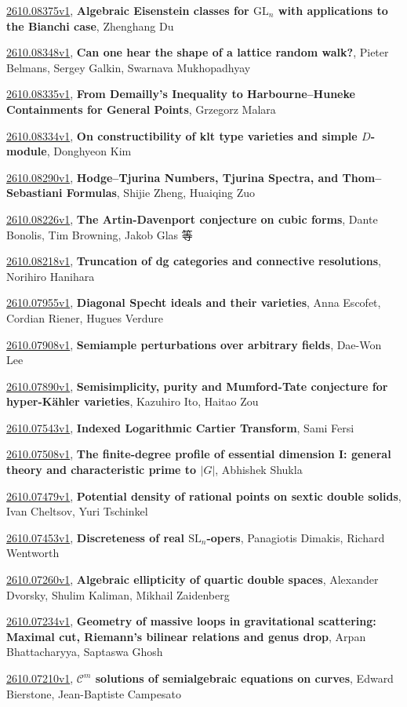 \documentclass[9pt, a4paper]{article}
\theoremstyle{plain}
\theoremstyle{definition}
\theoremstyle{remark}
\newcommand{\arxiv}[3]{\href{https://arxiv.org/abs/#1}{#1}, \textbf{\textcolor{arxivblue}{#2}}, #3}
\begin{document}
\arxiv{2610.08375v1}{Algebraic Eisenstein classes for $\mathrm{GL}_n$ with applications to the Bianchi case}{Zhenghang Du}

\arxiv{2610.08348v1}{Can one hear the shape of a lattice random walk?}{Pieter Belmans, Sergey Galkin, Swarnava Mukhopadhyay}

\arxiv{2610.08335v1}{From Demailly's Inequality to Harbourne--Huneke Containments for General Points}{Grzegorz Malara}

\arxiv{2610.08334v1}{On constructibility of klt type varieties and simple $D$-module}{Donghyeon Kim}

\arxiv{2610.08290v1}{Hodge--Tjurina Numbers, Tjurina Spectra, and Thom--Sebastiani Formulas}{Shijie Zheng, Huaiqing Zuo}

\arxiv{2610.08226v1}{The Artin-Davenport conjecture on cubic forms}{Dante Bonolis, Tim Browning, Jakob Glas 等}

\arxiv{2610.08218v1}{Truncation of dg categories and connective resolutions}{Norihiro Hanihara}

\arxiv{2610.07955v1}{Diagonal Specht ideals and their varieties}{Anna Escofet, Cordian Riener, Hugues Verdure}

\arxiv{2610.07908v1}{Semiample perturbations over arbitrary fields}{Dae-Won Lee}

\arxiv{2610.07890v1}{Semisimplicity, purity and Mumford-Tate conjecture for hyper-Kähler varieties}{Kazuhiro Ito, Haitao Zou}

\arxiv{2610.07543v1}{Indexed Logarithmic Cartier Transform}{Sami Fersi}

\arxiv{2610.07508v1}{The finite-degree profile of essential dimension I: general theory and characteristic prime to $|G|$}{Abhishek Shukla}

\arxiv{2610.07479v1}{Potential density of rational points on sextic double solids}{Ivan Cheltsov, Yuri Tschinkel}

\arxiv{2610.07453v1}{Discreteness of real $\mathrm{SL}_n$-opers}{Panagiotis Dimakis, Richard Wentworth}

\arxiv{2610.07260v1}{Algebraic ellipticity of quartic double spaces}{Alexander Dvorsky, Shulim Kaliman, Mikhail Zaidenberg}

\arxiv{2610.07234v1}{Geometry of massive loops in gravitational scattering: Maximal cut, Riemann's bilinear relations and genus drop}{Arpan Bhattacharyya, Saptaswa Ghosh}

\arxiv{2610.07210v1}{$\mathcal C^m$ solutions of semialgebraic equations on curves}{Edward Bierstone, Jean-Baptiste Campesato}
\end{document}
